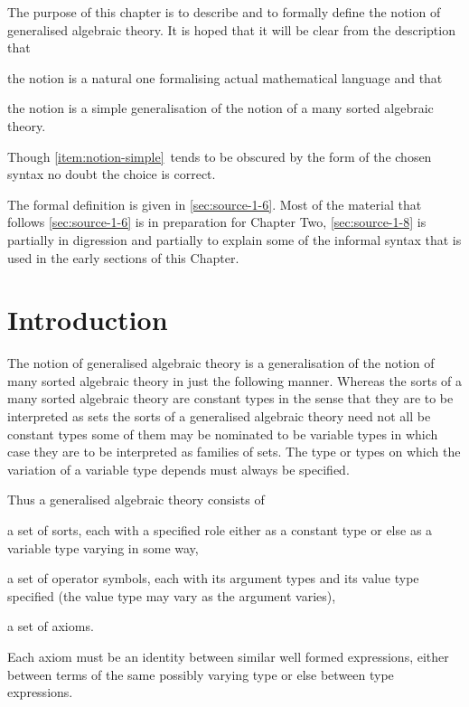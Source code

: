 
The purpose of this chapter is to describe and to formally define the notion of generalised algebraic theory.
%
It is hoped that it will be clear from the description that
\begin{enumerate*}[(i)]
\item the notion is a natural one formalising actual mathematical language and that
\item \label{item:notion-simple} the notion is a simple generalisation of the notion of a many sorted algebraic theory.
\end{enumerate*}
%
Though \ref{item:notion-simple}\ tends to be obscured by the form of the chosen syntax no doubt the choice is correct.

The formal definition is given in \textsection \ref{sec:source-1-6}.
%
Most of the material that follows \textsection \ref{sec:source-1-6} is in preparation for Chapter Two, \textsection \ref{sec:source-1-8} is partially in digression and partially to explain some of the informal syntax that is used in the early sections of this Chapter.

\section{Introduction} \label{sec:source-1-1}

The notion of generalised algebraic theory is a generalisation of the notion of many sorted algebraic theory in just the following manner.
%
Whereas the sorts of a many sorted algebraic theory are constant types in the sense that they are to be interpreted as sets the sorts of a generalised algebraic theory need not all be constant types some of them may be nominated to be variable types in which case they are to be interpreted as families of sets.
%
The type or types on which the variation of a variable type depends must always be specified.

Thus a generalised algebraic theory consists of
\begin{enumerate*}[(i)]
\item a set of sorts, each with a specified role either as a constant type or else as a variable type varying in some way,
\item a set of operator symbols, each with its argument types and its value type specified (the value type may vary as the argument varies),
\item a set of axioms.
\end{enumerate*}
%
Each axiom must be an identity between similar well formed expressions, either between terms of the same possibly varying type or else between type expressions.

